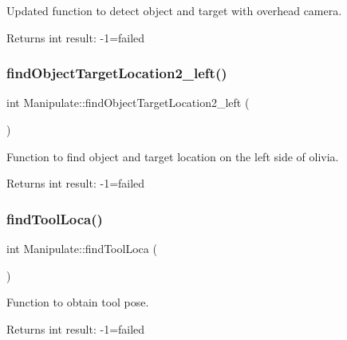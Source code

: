 Updated function to detect object and target with overhead camera. 

\begin{DoxyReturn}{Returns}
int result\+: -\/1=failed 
\end{DoxyReturn}
\mbox{\label{structManipulate_a8763018283f744613d7d50e6e22a27cf}} 
\subsubsection{\texorpdfstring{find\+Object\+Target\+Location2\+\_\+left()}{findObjectTargetLocation2\_left()}}
{\footnotesize\ttfamily int Manipulate\+::find\+Object\+Target\+Location2\+\_\+left (\begin{DoxyParamCaption}{ }\end{DoxyParamCaption})\hspace{0.3cm}{\ttfamily [private]}}



Function to find object and target location on the left side of olivia. 

\begin{DoxyReturn}{Returns}
int result\+: -\/1=failed 
\end{DoxyReturn}
\mbox{\label{structManipulate_a625fa2cac7d57ccc2e547461faf0a6e0}} 
\subsubsection{\texorpdfstring{find\+Tool\+Loca()}{findToolLoca()}}
{\footnotesize\ttfamily int Manipulate\+::find\+Tool\+Loca (\begin{DoxyParamCaption}{ }\end{DoxyParamCaption})\hspace{0.3cm}{\ttfamily [private]}}



Function to obtain tool pose. 

\begin{DoxyReturn}{Returns}
int result\+: -\/1=failed 
\end{DoxyReturn}
\mbox{\label{structManipulate_aedf7650241c029dd3007e8744796891a}} 
